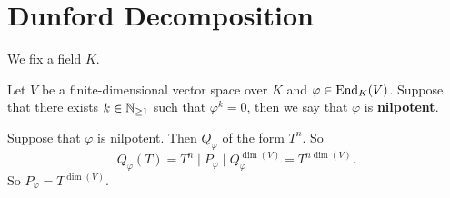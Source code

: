 \section{Dunford Decomposition}


We fix a field $K$.

\begin{definitionenv}
    Let $V$ be a finite-dimensional vector space over $K$ and $\varphi \in \operatorname{\mathrm{End}}_{K}(V)$.
    Suppose that there exists $k \in \mathbb{N}_{\ge 1}$ such that $\varphi^k = 0$, then we say that $\varphi$ is \textbf{nilpotent}.
\end{definitionenv}

\begin{remark}
    Suppose that $\varphi$ is nilpotent.
    Then $Q_{\varphi}$ of the form $T^n$.
    So
    $$Q_\varphi(T) = T^n \mid P_{\varphi} \mid Q_{\varphi}^{\dim(V)} = T^{n \dim(V)}.$$
    So $P_{\varphi} = T^{\dim(V)}$.
\end{remark}

